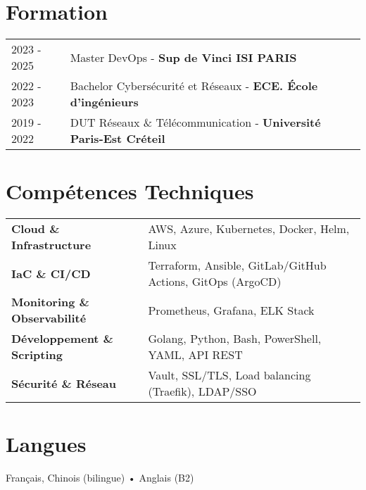 \documentclass[a4paper,11pt]{article}
\begin{document}
\section{Formation}
\begin{tabularx}{\linewidth}{@{}l X@{}}	
2023 - 2025 & Master DevOps - \textbf{Sup de Vinci ISI PARIS} \\
2022 - 2023 & Bachelor Cybersécurité et Réseaux - \textbf{ECE. École d'ingénieurs} \\
2019 - 2022 & DUT Réseaux \& Télécommunication - \textbf{Université Paris-Est Créteil} \\
\end{tabularx}

\section{Compétences Techniques}
\begin{tabularx}{\linewidth}{@{}l X@{}}
\textbf{Cloud \& Infrastructure} & AWS, Azure, Kubernetes, Docker, Helm, Linux \\[3pt]
\textbf{IaC \& CI/CD} & Terraform, Ansible, GitLab/GitHub Actions, GitOps (ArgoCD) \\[3pt]
\textbf{Monitoring \& Observabilité} & Prometheus, Grafana, ELK Stack \\[3pt]
\textbf{Développement \& Scripting} & Golang, Python, Bash, PowerShell, YAML, API REST \\[3pt]
\textbf{Sécurité \& Réseau} & Vault, SSL/TLS, Load balancing (Traefik), LDAP/SSO \\[3pt]
\end{tabularx}

\section{Langues}
Français, Chinois (bilingue) • Anglais (B2)
\end{document}
